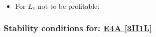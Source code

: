 \begin{itemize}
\begin{itemize}
		\item For $L_1$ not to be profitable:


	\end{itemize}

\end{itemize}



\subsubsection{Stability conditions for: \hyperref[apx:E4A:3H1L]{E4A [3H1L]}}
\label{apx:E4A:3H1L_stability_cond}

